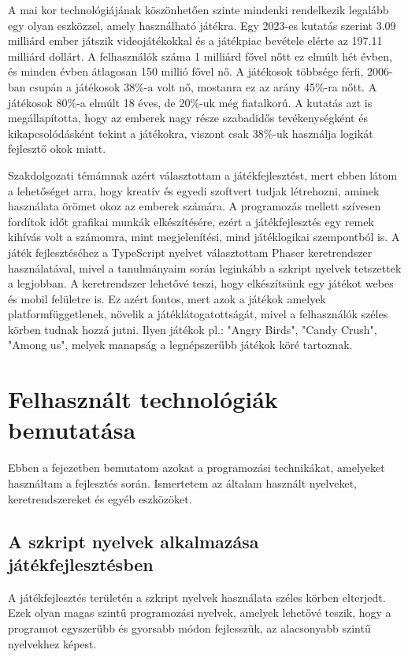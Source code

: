 \documentclass[12pt, a4paper]{report}
\theoremstyle{definition}
\begin{document}
	A mai kor technológiájának köszönhetően szinte mindenki rendelkezik legalább egy olyan eszközzel, amely használható játékra. Egy 2023-es kutatás szerint 3.09 milliárd ember játszik videojátékokkal és a játékpiac bevétele elérte az 197.11 milliárd dollárt. A felhasználók száma 1 milliárd fővel nőtt ez elmúlt hét  évben, és minden évben átlagosan 150 millió fővel nő. A játékosok többsége férfi, 2006-ban csupán a játékosok 38\%-a volt nő, mostanra ez az arány 45\%-ra nőtt. A játékosok 80\%-a elmúlt 18 éves, de 20\%-uk még fiatalkorú. A kutatás azt is megállapította, hogy az emberek nagy része szabadidős tevékenységként és kikapcsolódásként tekint a játékokra, viszont csak 38\%-uk használja logikát fejlesztő okok miatt.
	
	Szakdolgozati témámnak azért választottam a játékfejlesztést, mert ebben látom a lehetőséget arra, hogy kreatív és egyedi szoftvert tudjak létrehozni, aminek használata örömet okoz az emberek számára. A programozás mellett szívesen fordítok időt grafikai munkák elkészítésére, ezért a játékfejlesztés egy remek kihívás volt a számomra, mint megjelenítési, mind játéklogikai szempontból is. A játék fejlesztéséhez a TypeScript nyelvet választottam Phaser keretrendszer használatával, mivel a tanulmányaim során leginkább a szkript nyelvek tetszettek a legjobban. A keretrendszer lehetővé teszi, hogy elkészítsünk egy játékot webes és mobil felületre is. Ez azért fontos, mert azok a játékok amelyek platformfüggetlenek, növelik a játéklátogatottságát, mivel a felhasználók széles körben tudnak hozzá jutni. Ilyen játékok pl.: "Angry Birds", "Candy Crush", "Among us", melyek manapság a legnépszerűbb játékok köré tartoznak.
	
	
	\chapter{Felhasznált technológiák bemutatása}
	Ebben a fejezetben bemutatom azokat a programozási technikákat, amelyeket használtam a fejlesztés során. Ismertetem az általam használt nyelveket, keretrendszereket és egyéb eszközöket.
	\section{A szkript nyelvek alkalmazása játékfejlesztésben}
	A játékfejlesztés területén a szkript nyelvek használata széles körben elterjedt. 
	Ezek olyan magas szintű programozási nyelvek, amelyek lehetővé teszik, hogy a programot egyszerűbb és gyorsabb módon fejlesszük, az alacsonyabb szintű nyelvekhez képest.
	
\end{document}
